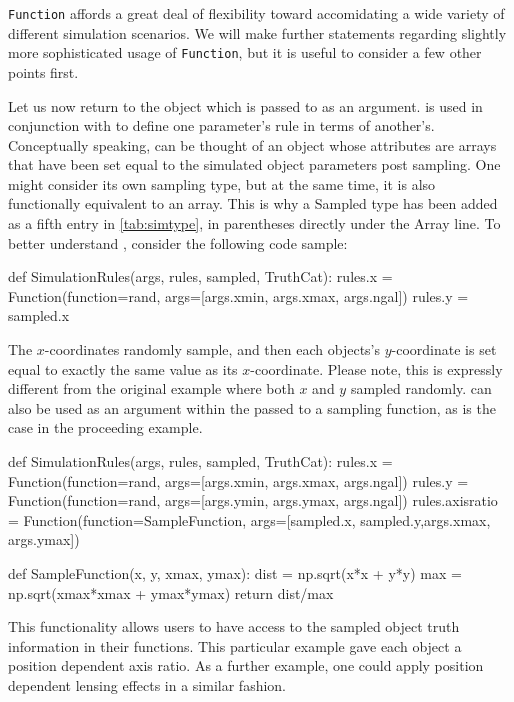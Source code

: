 \documentclass[11pt]{book}
\newcommand{\codett}[1]{\texttt{#1}}
\begin{document}
\noindent \codett{Function} affords a great deal of flexibility toward accomidating  a wide variety of different simulation scenarios.
We will make further statements regarding slightly more sophisticated usage
of \codett{Function}, but it is useful to consider a few other points first.

Let us now return to the \simsamp{} object which is passed to \simfunc{} as an argument.
\simsamp{} is used in conjunction with \simrules{} to define one parameter's rule in terms of another's.
Conceptually speaking, \simsamp{} can be thought of an object whose attributes are arrays that 
have been set equal to the simulated object parameters post sampling.
One might consider \simsamp{} its own sampling type, but at the same time, it is also functionally equivalent to an array.
This is why a Sampled type has been added as a fifth entry in \autoref{tab:simtype}, in parentheses directly under the Array line.
To better understand \simsamp{}, consider the following code sample:

\begin{code}
def SimulationRules(args, rules, sampled, TruthCat):
    rules.x = Function(function=rand, args=[args.xmin, args.xmax, args.ngal])
    rules.y = sampled.x
\end{code}

\noindent The $x$-coordinates randomly sample, and then each objects's $y$-coordinate
is set equal to exactly the same value as its $x$-coordinate.
Please note, this is expressly different from the original example where both $x$ and $y$ sampled randomly.
\simsamp{} can also be used as an argument within the \simargs{} passed to a sampling function,
as is the case in the proceeding example.

\begin{code}
def SimulationRules(args, rules, sampled, TruthCat):
    rules.x = Function(function=rand, args=[args.xmin, args.xmax, args.ngal])
    rules.y = Function(function=rand, args=[args.ymin, args.ymax, args.ngal])
    rules.axisratio = Function(function=SampleFunction, args=[sampled.x, sampled.y,args.xmax, args.ymax])

def SampleFunction(x, y, xmax, ymax):
    dist = np.sqrt(x*x + y*y)
    max = np.sqrt(xmax*xmax + ymax*ymax)
    return dist/max
\end{code}

\noindent This functionality allows users to have access to the sampled object truth
information in their functions.
This particular example gave each object a position dependent axis ratio.
As a further example, one could apply position dependent lensing effects in a similar fashion.
\end{document}
